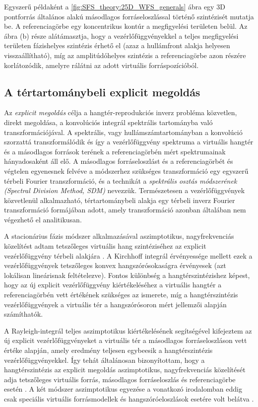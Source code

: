 \documentclass[10pt,twoside]{article}
\theoremstyle{thesisgroupstyle}
\theoremstyle{indented}
\begin{document}
Egyszerű példaként a \ref{fig:SFS_theory:25D_WFS_generals} ábra egy 3D pontforrás általános alakú másodlagos forráseloszlással történő szintézisét mutatja be.
A referenciagörbe egy koncentrikus kontúr a megfigyelési területen belül.
Az ábra (b) része alátámasztja, hogy a vezérlőfüggvényekkel a teljes megfigyelési területen fázishelyes szintézis érhető el (azaz a hullámfront alakja helyesen visszaállítható), míg az amplitúdóhelyes szintézis a referenciagörbe azon részére korlátozódik, amelyre rálátni az adott virtuális forráspozícióból.

\subsection{A tértartománybeli explicit megoldás}

Az \emph{explicit megoldás} célja a hangtér-reprodukciós inverz probléma közvetlen, direkt megoldása, a konvolúciós integrál spektrális tartományba való transzformációjával.
A spektrális, vagy hullámszámtartományban a konvolúció szorzattá transzformálódik és így a vezérlőfüggvény spektruma a virtuális hangtér és a másodlagos források terének a referenciagörbén mért spektrumainak hányadosaként áll elő.
A másodlagos forráseloszlást és a referenciagörbét és végtelen egyenesnek felvéve a módszerhez szükséges transzformáció egy egyszerű térbeli Fourier transzformáció, és a technikát a \emph{spektrális osztás módszerének (Spectral Division Method, SDM)} nevezzük.
Természetesen a vezérlőfüggvények közvetlenül alkalmazható, tértartománybeli alakja egy térbeli inverz Fourier transzformáció formájában adott, amely transzformáció azonban általában nem végezhető el analitikusan.

A stacionárius fázis módszer alkalmazásával aszimptotikus, nagyfrekvenciás közelítést adtam tetszőleges virtuális hang szintéziséhez az explicit vezérlőfüggvény térbeli alakjára \cite{Firtha2017:daga_booklet}.
A Kirchhoff integrál érvényessége mellett ezek a vezérlőfüggvények tetszőleges konvex hangszórósokaságra érvényesek (azt lokálisan lineárisnak feltételezve).
Fontos különbség a hangtérszintézishez képest, hogy az új explicit vezérlőfüggvény kiértékeléséhez a virtuális hangtér a referenciagörbén vett értékének szükséges az ismerete, míg a hangtérszintézis vezérlőfüggvények a virtuális tér a hangszórósoron mért jellemzői alapján számíthatók.

A Rayleigh-integrál teljes aszimptotikus kiértékelésének segítségével kifejeztem az új explicit vezérlőfüggvényeket a virtuális tér a másodlagos forráseloszláson vett értéke alapján, amely eredmény teljesen egybeesik a hangtérszintézis vezérlőfüggvényekkel.
Így tehát általánosan bizonyítottam, hogy a hangtérszintézis az explicit megoldás aszimptotikus, nagyfrekvenciás közelítését adja tetszőleges virtuális forrás, másodlagos forráseloszlás és referenciagörbe esetén \cite{Firtha2018:WFS_vs_SDM_booklet}.
A két módszer aszimptotikus egyezése a vonatkozó irodalomban eddig csak speciális virtuális forrásmodellek és hangszóróeloszlások esetére volt belátva \cite{Schultz2019:HOA_vs_WFS_booklet}.
\end{document}
